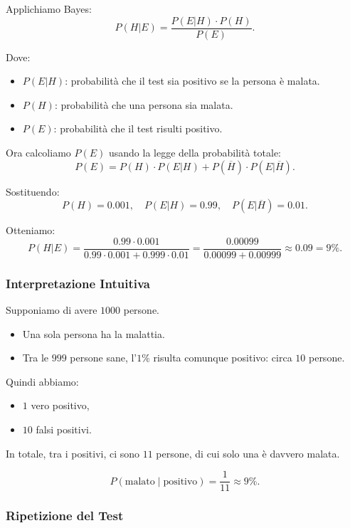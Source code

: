 Applichiamo Bayes:
\begin{equation}
P(H|E) = \frac{P(E|H)\cdot P(H)}{P(E)}.
\end{equation}

Dove:
\begin{itemize}
\item $P(E|H)$: probabilità che il test sia positivo se la persona è malata.
\item $P(H)$: probabilità che una persona sia malata.
\item $P(E)$: probabilità che il test risulti positivo.
\end{itemize}

Ora calcoliamo $P(E)$ usando la legge della probabilità totale:
\begin{equation}
P(E) = P(H)\cdot P(E|H) + P(\overline{H})\cdot P(E|\overline{H}).
\end{equation}

Sostituendo:
\[
P(H) = 0.001, \quad
P(E|H) = 0.99, \quad
P(E|\overline{H}) = 0.01.
\]

Otteniamo:
\[
P(H|E) = \frac{0.99\cdot 0.001}{0.99\cdot 0.001 + 0.999\cdot 0.01}
= \frac{0.00099}{0.00099 + 0.00999}
\approx 0.09 = 9\%.
\]

\subsubsection{Interpretazione Intuitiva}

Supponiamo di avere $1000$ persone.

\begin{itemize}
\item Una sola persona ha la malattia.
\item Tra le $999$ persone sane, l'$1\%$ risulta comunque positivo: circa $10$ persone.
\end{itemize}

Quindi abbiamo:

\begin{itemize}
\item $1$ vero positivo,
\item $10$ falsi positivi.
\end{itemize}

In totale, tra i positivi, ci sono $11$ persone, di cui solo una è davvero malata.

\[
P(\text{malato} \mid \text{positivo}) = \frac{1}{11} \approx 9\%.
\]

\subsubsection{Ripetizione del Test}

